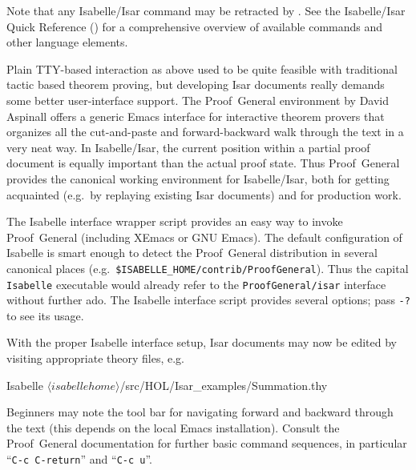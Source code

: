 \begin{isabellebody}
\begin{isamarkuptext}
  Note that any Isabelle/Isar command may be retracted by \mbox{}.  See the Isabelle/Isar Quick Reference
  () for a comprehensive overview of available
  commands and other language elements.%
\end{isamarkuptext}%
\isamarkuptrue%
%
\isamarkuptrue%
%
\begin{isamarkuptext}%
Plain TTY-based interaction as above used to be quite feasible with
  traditional tactic based theorem proving, but developing Isar
  documents really demands some better user-interface support.  The
  Proof~General environment by David Aspinall
  \cite{proofgeneral,Aspinall:TACAS:2000} offers a generic Emacs
  interface for interactive theorem provers that organizes all the
  cut-and-paste and forward-backward walk through the text in a very
  neat way.  In Isabelle/Isar, the current position within a partial
  proof document is equally important than the actual proof state.
  Thus Proof~General provides the canonical working environment for
  Isabelle/Isar, both for getting acquainted (e.g.\ by replaying
  existing Isar documents) and for production work.%
\end{isamarkuptext}%
\isamarkuptrue%
%
\isamarkuptrue%
%
\begin{isamarkuptext}%
The Isabelle interface wrapper script provides an easy way to invoke
  Proof~General (including XEmacs or GNU Emacs).  The default
  configuration of Isabelle is smart enough to detect the
  Proof~General distribution in several canonical places (e.g.\
  \verb|$ISABELLE_HOME/contrib/ProofGeneral|).  Thus the
  capital \verb|Isabelle| executable would already refer to the
  \verb|ProofGeneral/isar| interface without further ado.  The
  Isabelle interface script provides several options; pass \verb|-?|  to see its usage.

  With the proper Isabelle interface setup, Isar documents may now be edited by
  visiting appropriate theory files, e.g.\ 
\begin{ttbox}
Isabelle \({\langle}isabellehome{\rangle}\)/src/HOL/Isar_examples/Summation.thy
\end{ttbox}
  Beginners may note the tool bar for navigating forward and backward
  through the text (this depends on the local Emacs installation).
  Consult the Proof~General documentation \cite{proofgeneral} for
  further basic command sequences, in particular ``\verb|C-c C-return|''
  and ``\verb|C-c u|''.


\end{isamarkuptext}
\end{isabellebody}
